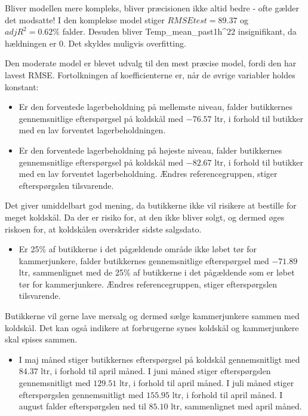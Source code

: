 \documentclass[
  12pt,
  a4paper,
  DIV=11,
  numbers=noendperiod]{scrartcl}
\providecommand{\tightlist}{%
  \setlength{\itemsep}{0pt}\setlength{\parskip}{0pt}}\usepackage{longtable,booktabs,array}
\begin{document}
Bliver modellen mere kompleks, bliver præcisionen ikke altid bedre -
ofte gælder det modsatte! I den komplekse model stiger
\(RMSEtest=89.37\) og \(adjR^2 = 0.62\%\) falder. Desuden bliver
Temp\_mean\_past1h\^{}22 insignifikant, da hældningen er 0. Det skyldes
muligvis overfitting.

Den moderate model er blevet udvalg til den mest præcise model, fordi
den har lavest RMSE. Fortolkningen af koefficienterne er, når de øvrige
variabler holdes konstant:

\begin{itemize}
\item
  Er den forventede lagerbeholdning på mellemste niveau, falder
  butikkernes gennemsnitlige efterspørgsel på koldskål med \(-76.57\)
  ltr, i forhold til butikker med en lav forventet lagerbeholdningen.
\item
  Er den forventede lagerbeholdning på højeste niveau, falder
  butikkernes gennemsnitlige efterspørgsel på koldskål med \(-82.67\)
  ltr, i forhold til butikker med en lav forventet lagerbeholdning.
  Ændres referencegruppen, stiger efterspørgslen tilsvarende.
\end{itemize}

Det giver umiddelbart god mening, da butikkerne ikke vil risikere at
bestille for meget koldskål. Da der er risiko for, at den ikke bliver
solgt, og dermed øges riskoen for, at koldskålen overskrider sidste
salgsdato.

\begin{itemize}
\tightlist
\item
  Er 25\% af butikkerne i det pågældende område ikke løbet tør for
  kammerjunkere, falder butikkernes gennemsnitlige efterspørgsel med
  \(-71.89\) ltr, sammenlignet med de 25\% af butikkerne i det
  pågældende som er løbet tør for kammerjunkere. Ændres
  referencegruppen, stiger efterspørgslen tilsvarende.
\end{itemize}

Butikkerne vil gerne lave mersalg og dermed sælge kammerjunkere sammen
med koldskål. Det kan også indikere at forbrugerne synes koldskål og
kammerjunkere skal spises sammen.

\begin{itemize}
\tightlist
\item
  I maj måned stiger butikkernes efterspørgsel på koldskål
  gennemsnitligt med \(84.37\) ltr, i forhold til april måned. I juni
  måned stiger efterspørgslen gennemsnitligt med \(129.51\) ltr, i
  forhold til april måned. I juli måned stiger efterspørgslen
  gennemsnitligt med \(155.95\) ltr, i forhold til april måned. I august
  falder efterspørgslen ned til \(85.10\) ltr, sammenlignet med april
  måned.
\end{itemize}
\end{document}
